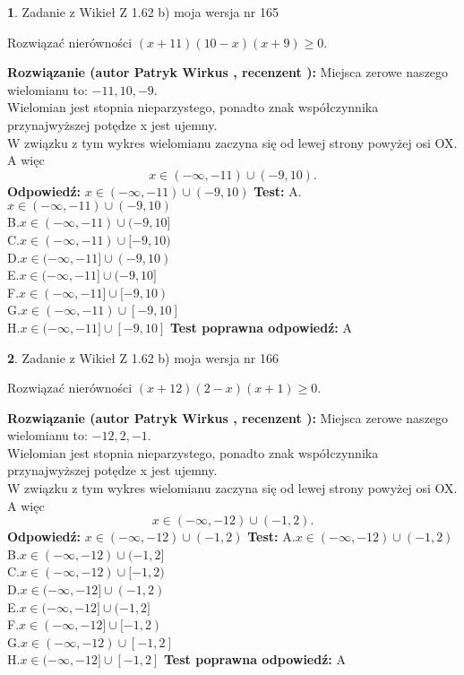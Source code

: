 \documentclass[12pt, a4paper]{article}
\theoremstyle{definition} %
\newtheorem{zad}{}
\newcommand{\zadStart}[1]{\begin{zad}#1\newline}
\newcommand{\zadStop}{\end{zad}}
\newcommand{\rozwStart}[2]{\noindent \textbf{Rozwiązanie (autor #1 , recenzent #2): }\newline}
\newcommand{\rozwStop}{\newline}
\newcommand{\odpStart}{\noindent \textbf{Odpowiedź:}\newline}
\newcommand{\odpStop}{\newline}
\newcommand{\testStart}{\noindent \textbf{Test:}\newline}
\newcommand{\testStop}{\newline}
\newcommand{\kluczStart}{\noindent \textbf{Test poprawna odpowiedź:}\newline}
\newcommand{\kluczStop}{\newline}
\begin{document}
\zadStart{Zadanie z Wikieł Z 1.62 b) moja wersja nr 165}

Rozwiązać nierówności $(x+11)(10-x)(x+9)\ge0$.
\zadStop
\rozwStart{Patryk Wirkus}{}
Miejsca zerowe naszego wielomianu to: $-11, 10, -9$.\\
Wielomian jest stopnia nieparzystego, ponadto znak współczynnika przy\linebreak najwyższej potędze x jest ujemny.\\ W związku z tym wykres wielomianu zaczyna się od lewej strony powyżej osi OX. A więc $$x \in (-\infty,-11) \cup (-9,10).$$
\rozwStop
\odpStart
$x \in (-\infty,-11) \cup (-9,10)$
\odpStop
\testStart
A.$x \in (-\infty,-11) \cup (-9,10)$\\
B.$x \in (-\infty,-11) \cup (-9,10]$\\
C.$x \in (-\infty,-11) \cup [-9,10)$\\
D.$x \in (-\infty,-11] \cup (-9,10)$\\
E.$x \in (-\infty,-11] \cup (-9,10]$\\
F.$x \in (-\infty,-11] \cup [-9,10)$\\
G.$x \in (-\infty,-11) \cup [-9,10]$\\
H.$x \in (-\infty,-11] \cup [-9,10]$
\testStop
\kluczStart
A
\kluczStop



\zadStart{Zadanie z Wikieł Z 1.62 b) moja wersja nr 166}

Rozwiązać nierówności $(x+12)(2-x)(x+1)\ge0$.
\zadStop
\rozwStart{Patryk Wirkus}{}
Miejsca zerowe naszego wielomianu to: $-12, 2, -1$.\\
Wielomian jest stopnia nieparzystego, ponadto znak współczynnika przy\linebreak najwyższej potędze x jest ujemny.\\ W związku z tym wykres wielomianu zaczyna się od lewej strony powyżej osi OX. A więc $$x \in (-\infty,-12) \cup (-1,2).$$
\rozwStop
\odpStart
$x \in (-\infty,-12) \cup (-1,2)$
\odpStop
\testStart
A.$x \in (-\infty,-12) \cup (-1,2)$\\
B.$x \in (-\infty,-12) \cup (-1,2]$\\
C.$x \in (-\infty,-12) \cup [-1,2)$\\
D.$x \in (-\infty,-12] \cup (-1,2)$\\
E.$x \in (-\infty,-12] \cup (-1,2]$\\
F.$x \in (-\infty,-12] \cup [-1,2)$\\
G.$x \in (-\infty,-12) \cup [-1,2]$\\
H.$x \in (-\infty,-12] \cup [-1,2]$
\testStop
\kluczStart
A
\kluczStop
\end{document}
